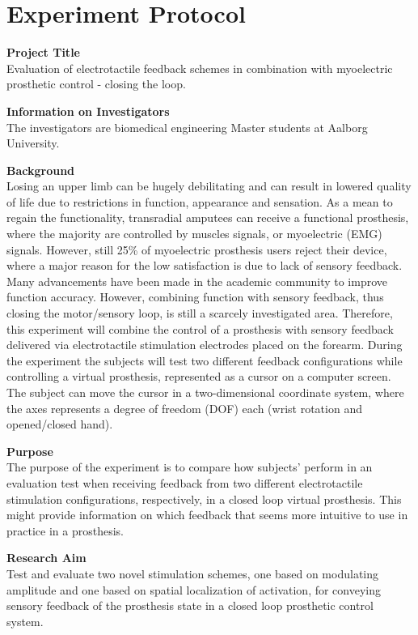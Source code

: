 \section{Experiment Protocol} \label{Ex_protocol}

\textbf{Project Title} \\
Evaluation of electrotactile feedback schemes in combination with myoelectric prosthetic control - closing the loop. 

\textbf{Information on Investigators} \\
The investigators are biomedical engineering Master students at Aalborg University. 

\textbf{Background} \\
Losing an upper limb can be hugely debilitating and can result in lowered quality of life due to restrictions in function, appearance and sensation. As a mean to regain the functionality, transradial amputees can receive a functional prosthesis, where the majority are controlled by muscles signals, or myoelectric (EMG) signals. However, still 25\% of myoelectric prosthesis users reject their device, where a major reason for the low satisfaction is due to lack of sensory feedback.
Many advancements have been made in the academic community to improve function accuracy. However, combining function with sensory feedback, thus closing the motor/sensory loop, is still a scarcely investigated area. Therefore, this experiment will combine the control of a prosthesis with sensory feedback delivered via electrotactile stimulation electrodes placed on the forearm. During the experiment the subjects will test two different feedback configurations while controlling a virtual prosthesis, represented as a cursor on a computer screen. The subject can move the cursor in a two-dimensional coordinate system, where the axes represents a degree of freedom (DOF) each (wrist rotation and opened/closed hand).

\textbf{Purpose} \\
The purpose of the experiment is to compare how subjects' perform in an evaluation test when receiving feedback from two different electrotactile stimulation configurations, respectively, in a closed loop virtual prosthesis. This might provide information on which feedback that seems more intuitive to use in practice in a prosthesis.

\textbf{Research Aim} \\
Test and evaluate two novel stimulation schemes, one based on modulating amplitude and one based on spatial localization of activation, for conveying sensory feedback of the prosthesis state in a closed loop prosthetic control system.

